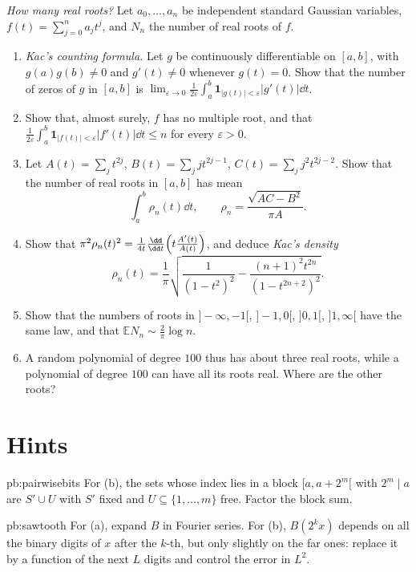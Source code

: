 \begin{exercise}[Journey]\label{pb:kaczeros}
\emph{How many real roots?} Let $a_0,\dots,a_n$ be independent standard Gaussian variables, $f(t)=\sum_{j=0}^na_jt^j$, and $N_n$ the number of real roots of $f$.
\begin{enumerate}[label=(\alph*)]
\item \emph{Kac's counting formula.} Let $g$ be continuously differentiable on $[a,b]$, with $g(a)g(b)\ne0$ and $g'(t)\ne0$ whenever $g(t)=0$. Show that the number
of zeros of $g$ in $[a,b]$ is $\lim_{\varepsilon\to0}\frac1{2\varepsilon}\int_a^b\mathbf 1_{|g(t)|<\varepsilon}|g'(t)|\dd t$.
\item Show that, almost surely, $f$ has no multiple root, and that $\frac1{2\varepsilon}\int_a^b\mathbf 1_{|f(t)|<\varepsilon}|f'(t)|\dd t\le n$ for every $\varepsilon>0$.
\item Let $A(t)=\sum_jt^{2j}$, $B(t)=\sum_jjt^{2j-1}$, $C(t)=\sum_jj^2t^{2j-2}$. Show that the number of real roots in $[a,b]$ has mean
\[
\int_a^b\rho_n(t)\dd t,\qquad \rho_n=\frac{\sqrt{AC-B^2}}{\pi A}.
\]
\item Show that $\pi^2\rho_n(t)^2=\frac1{4t}\frac{\dd}{\dd t}\Bigl(t\frac{A'(t)}{A(t)}\Bigr)$, and deduce \emph{Kac's density}
\[
\rho_n(t)=\frac1\pi\sqrt{\frac1{(1-t^2)^2}-\frac{(n+1)^2t^{2n}}{(1-t^{2n+2})^2}}.
\]
\item Show that the numbers of roots in $]-\infty,-1[$, $]-1,0[$, $]0,1[$, $]1,\infty[$ have the same law, and that $\mathbb EN_n\sim\frac2\pi\log n$.
\item A random polynomial of degree $100$ thus has about three real roots, while a polynomial of degree $100$ can have all its roots real. Where are the
other roots?
\end{enumerate}
\end{exercise}

\section*{Hints}

\begin{hint}{pb:pairwisebits}
For (b), the sets whose index lies in a block $[a,a+2^m[$ with $2^m\mid a$ are $S'\cup U$ with $S'$ fixed and $U\subseteq\{1,\dots,m\}$ free. Factor the block sum.
\end{hint}

\begin{hint}{pb:sawtooth}
For (a), expand $B$ in Fourier series. For (b), $B(2^kx)$ depends on all the binary digits of $x$ after the $k$-th, but only slightly on the far ones:
replace it by a function of the next $L$ digits and control the error in $L^2$.
\end{hint}

